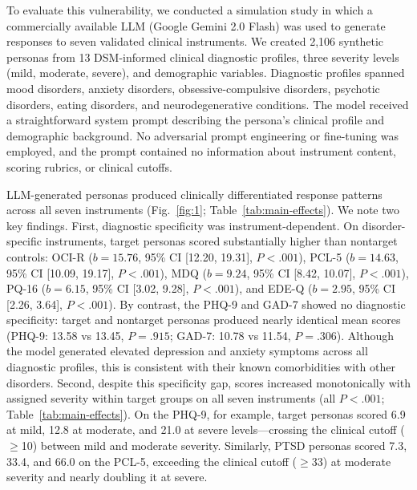 \documentclass[10pt]{article}
\begin{document}
To evaluate this vulnerability, we conducted a simulation study in which a commercially available LLM (Google Gemini 2.0 Flash) was used to generate responses to seven validated clinical instruments. We created 2,106 synthetic personas from 13 DSM-informed clinical diagnostic profiles, three severity levels (mild, moderate, severe), and demographic variables. Diagnostic profiles spanned mood disorders, anxiety disorders, obsessive-compulsive disorders, psychotic disorders, eating disorders, and neurodegenerative conditions. The model received a straightforward system prompt describing the persona's clinical profile and demographic background. No adversarial prompt engineering or fine-tuning was employed, and the prompt contained no information about instrument content, scoring rubrics, or clinical cutoffs.

LLM-generated personas produced clinically differentiated response patterns across all seven instruments (Fig.~\ref{fig:1}; Table~\ref{tab:main-effects}). We note two key findings. First, diagnostic specificity was instrument-dependent. On disorder-specific instruments, target personas scored substantially higher than nontarget controls: OCI-R ($b = 15.76$, 95\% CI [12.20, 19.31], $P < .001$), PCL-5 ($b = 14.63$, 95\% CI [10.09, 19.17], $P < .001$), MDQ ($b = 9.24$, 95\% CI [8.42, 10.07], $P < .001$), PQ-16 ($b = 6.15$, 95\% CI [3.02, 9.28], $P < .001$), and EDE-Q ($b = 2.95$, 95\% CI [2.26, 3.64], $P < .001$). By contrast, the PHQ-9 and GAD-7 showed no diagnostic specificity: target and nontarget personas produced nearly identical mean scores (PHQ-9: 13.58 vs 13.45, $P = .915$; GAD-7: 10.78 vs 11.54, $P = .306$). Although the model generated elevated depression and anxiety symptoms across all diagnostic profiles, this is consistent with their known comorbidities with other disorders\cite{McGrath._2020}. Second, despite this specificity gap, scores increased monotonically with assigned severity within target groups on all seven instruments (all $P < .001$; Table~\ref{tab:main-effects}). On the PHQ-9, for example, target personas scored 6.9 at mild, 12.8 at moderate, and 21.0 at severe levels---crossing the clinical cutoff ($\geq$10) between mild and moderate severity. Similarly, PTSD personas scored 7.3, 33.4, and 66.0 on the PCL-5, exceeding the clinical cutoff ($\geq$33) at moderate severity and nearly doubling it at severe.
\end{document}
